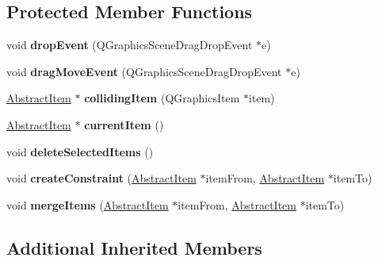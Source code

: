 \subsection*{Protected Member Functions}
\begin{DoxyCompactItemize}
\item 
\hypertarget{class_events_scene_a2c4fe71dfd8489c87ad7cc3ed290c4c9}{void {\bfseries drop\-Event} (Q\-Graphics\-Scene\-Drag\-Drop\-Event $\ast$e)}\label{class_events_scene_a2c4fe71dfd8489c87ad7cc3ed290c4c9}

\item 
\hypertarget{class_events_scene_a1b90d71955494495e95cb373f7e720a3}{void {\bfseries drag\-Move\-Event} (Q\-Graphics\-Scene\-Drag\-Drop\-Event $\ast$e)}\label{class_events_scene_a1b90d71955494495e95cb373f7e720a3}

\item 
\hypertarget{class_events_scene_ade2a20fd006ab240daf07c7b192aa31b}{\hyperlink{class_abstract_item}{Abstract\-Item} $\ast$ {\bfseries colliding\-Item} (Q\-Graphics\-Item $\ast$item)}\label{class_events_scene_ade2a20fd006ab240daf07c7b192aa31b}

\item 
\hypertarget{class_events_scene_a7def7f8c31b9354d9943d28c16e1b5c6}{\hyperlink{class_abstract_item}{Abstract\-Item} $\ast$ {\bfseries current\-Item} ()}\label{class_events_scene_a7def7f8c31b9354d9943d28c16e1b5c6}

\item 
\hypertarget{class_events_scene_a1329af93a3d09a7ffe14e186d0001135}{void {\bfseries delete\-Selected\-Items} ()}\label{class_events_scene_a1329af93a3d09a7ffe14e186d0001135}

\item 
\hypertarget{class_events_scene_a0bf1abf4bf7e440b64298d4ca1ceb06a}{void {\bfseries create\-Constraint} (\hyperlink{class_abstract_item}{Abstract\-Item} $\ast$item\-From, \hyperlink{class_abstract_item}{Abstract\-Item} $\ast$item\-To)}\label{class_events_scene_a0bf1abf4bf7e440b64298d4ca1ceb06a}

\item 
\hypertarget{class_events_scene_aafb49de5948773521cb305d0dd6b33ff}{void {\bfseries merge\-Items} (\hyperlink{class_abstract_item}{Abstract\-Item} $\ast$item\-From, \hyperlink{class_abstract_item}{Abstract\-Item} $\ast$item\-To)}\label{class_events_scene_aafb49de5948773521cb305d0dd6b33ff}

\end{DoxyCompactItemize}
\subsection*{Additional Inherited Members}


